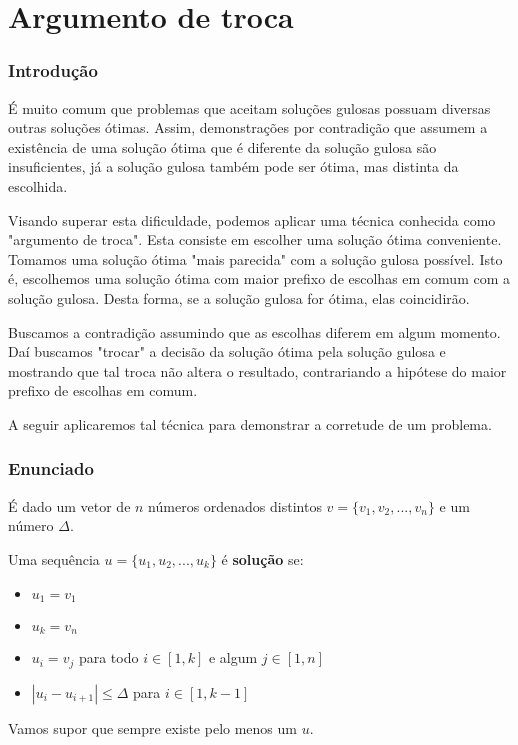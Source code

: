 \chapter{Argumento de troca}
\label{salto}

\subsection*{Introdução}

É muito comum que problemas que aceitam soluções gulosas possuam diversas outras soluções ótimas. Assim, demonstrações por contradição que assumem a existência de uma solução ótima que é diferente da solução gulosa são insuficientes, já a solução gulosa também pode ser ótima, mas distinta da escolhida.

Visando superar esta dificuldade, podemos aplicar uma técnica conhecida como "argumento de troca". Esta consiste em escolher uma solução ótima conveniente. Tomamos uma solução ótima "mais parecida" com a solução gulosa possível. Isto é, escolhemos uma solução ótima com maior prefixo de escolhas em comum com a solução gulosa. Desta forma, se a solução gulosa for ótima, elas coincidirão.

Buscamos a contradição assumindo que as escolhas diferem em algum momento. Daí buscamos "trocar" a decisão da solução ótima pela solução gulosa e mostrando que tal troca não altera o resultado, contrariando a hipótese do maior prefixo de escolhas em comum.

A seguir aplicaremos tal técnica para demonstrar a corretude de um problema.

\subsection*{Enunciado}

É dado um vetor de $n$ números ordenados distintos $v = \{v_1, v_2, ..., v_n\}$ e um número $\Delta$.

Uma sequência $u = \{u_1, u_2, ..., u_k\}$ é \textbf{solução} se:
\begin{itemize}
    \item $u_1 = v_1$
    \item $u_k = v_n$
    \item $u_i = v_j$ para todo $i \in [1, k]$ e algum $j \in [1, n]$
    \item $|u_i - u_{i + 1}| \leq \Delta$ para $i \in [1, k - 1]$
\end{itemize}

Vamos supor que sempre existe pelo menos um $u$.

